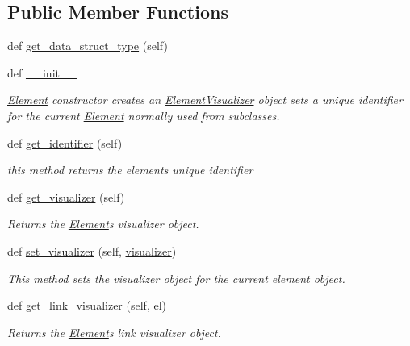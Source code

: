 \subsection*{Public Member Functions}
\begin{DoxyCompactItemize}
\item 
def \hyperlink{class_element_1_1_element_a63841eee278ab0fa41a13260b920047a}{get\+\_\+data\+\_\+struct\+\_\+type} (self)
\item 
def \hyperlink{class_element_1_1_element_a359371465b7c4d21611adec7e86c3b33}{\+\_\+\+\_\+init\+\_\+\+\_\+}
\begin{DoxyCompactList}\small\item\em \hyperlink{class_element_1_1_element}{Element} constructor creates an \hyperlink{namespace_element_visualizer}{Element\+Visualizer} object sets a unique identifier for the current \hyperlink{class_element_1_1_element}{Element} normally used from subclasses. \end{DoxyCompactList}\item 
def \hyperlink{class_element_1_1_element_a21dea942c0fbad14a21dc79ca0acee5a}{get\+\_\+identifier} (self)
\begin{DoxyCompactList}\small\item\em this method returns the element\textquotesingle{}s unique identifier \end{DoxyCompactList}\item 
def \hyperlink{class_element_1_1_element_a531997947dbe846efee0772e933a0924}{get\+\_\+visualizer} (self)
\begin{DoxyCompactList}\small\item\em Returns the \hyperlink{class_element_1_1_element}{Element}\textquotesingle{}s visualizer object. \end{DoxyCompactList}\item 
def \hyperlink{class_element_1_1_element_a431996076dbd3e58c2a94c0f64277fe9}{set\+\_\+visualizer} (self, \hyperlink{class_element_1_1_element_a7a5b8e1891bf065fa81f51a8f6b4212e}{visualizer})
\begin{DoxyCompactList}\small\item\em This method sets the visualizer object for the current element object. \end{DoxyCompactList}\item 
def \hyperlink{class_element_1_1_element_acb2af0ae480e513bb3f3402c846fbe86}{get\+\_\+link\+\_\+visualizer} (self, el)
\begin{DoxyCompactList}\small\item\em Returns the \hyperlink{class_element_1_1_element}{Element}\textquotesingle{}s link visualizer object. \end{DoxyCompactList}\item 

\end{DoxyCompactItemize}
